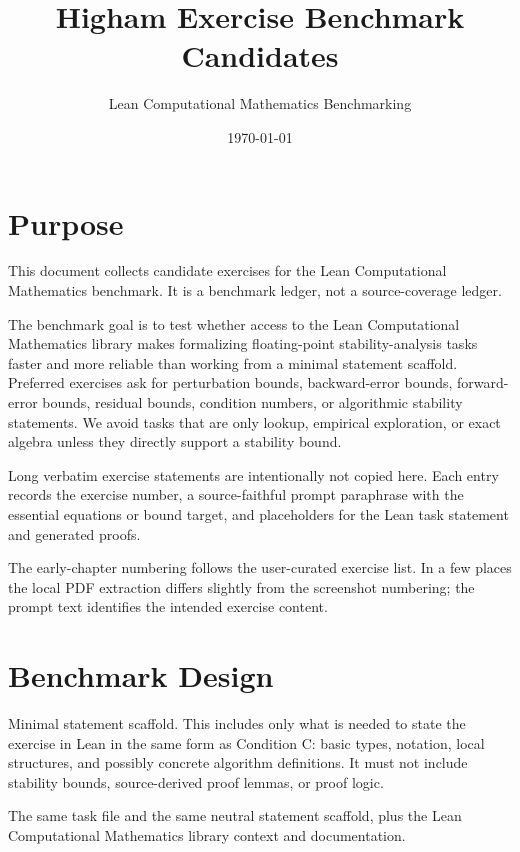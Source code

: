 \documentclass[11pt]{article}
\title{Higham Exercise Benchmark Candidates}
\author{Lean Computational Mathematics Benchmarking}
\date{\today}
\begin{document}
\maketitle

\section{Purpose}

This document collects candidate exercises for the Lean Computational Mathematics benchmark.
It is a benchmark ledger, not a source-coverage ledger.

The benchmark goal is to test whether access to the Lean Computational Mathematics library
makes formalizing floating-point stability-analysis tasks faster and more
reliable than working from a minimal statement scaffold.  Preferred exercises ask for
perturbation bounds, backward-error bounds, forward-error bounds, residual
bounds, condition numbers, or algorithmic stability statements.  We avoid
tasks that are only lookup, empirical exploration, or exact algebra unless
they directly support a stability bound.

Long verbatim exercise statements are intentionally not copied here.  Each
entry records the exercise number, a source-faithful prompt paraphrase with
the essential equations or bound target, and placeholders for the Lean task
statement and generated proofs.

The early-chapter numbering follows the user-curated exercise list.  In a few
places the local PDF extraction differs slightly from the screenshot numbering;
the prompt text identifies the intended exercise content.

\section{Benchmark Design}

\begin{description}[style=nextline,leftmargin=3.2cm,font=\normalfont\bfseries]
  \item[Condition A] Minimal statement scaffold.  This includes only what is
  needed to state the exercise in Lean in the same form as Condition C: basic
  types, notation, local structures, and possibly concrete algorithm definitions.
  It must not include stability bounds, source-derived proof lemmas, or proof
  logic.
  \item[Condition C] The same task file and the same neutral statement scaffold,
  plus the Lean Computational Mathematics library context and documentation.
\end{description}
\end{document}
